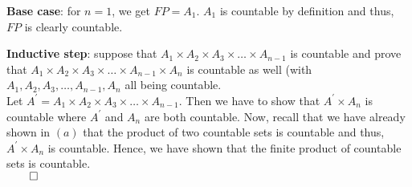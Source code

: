 \documentclass[11pt]{article}
\begin{document}
\begin{itemize}
\begin{itemize}
                \textbf{Base case}: for $n = 1$, we get $FP = A_1$. $A_1$ is
                countable by definition and thus, $FP$ is clearly countable.

                \textbf{Inductive step}: suppose that $A_1 \times A_2 \times
                A_3 \times \dots \times A_{n - 1}$ is countable and prove that
                $A_1 \times A_2 \times A_3 \times \dots \times A_{n - 1} \times
                A_n$ is countable as well (with $A_1, A_2, A_3, \dots, A_{n -
                1}, A_n$ all being countable.
                \\
                Let $A^\prime = A_1 \times A_2 \times A_3 \times \dots \times
                A_{n - 1}$. Then we have to show that $A^\prime \times A_n$ is
                countable where $A^\prime$ and $A_n$ are both countable. Now,
                recall that we have already shown in $(a)$ that the product of
                two countable sets is countable and thus, $A^\prime \times A_n$
                is countable. Hence, we have shown that the finite product of
                countable sets is countable.\\
                $\qed$


\end{itemize}
\end{itemize}
\end{document}
